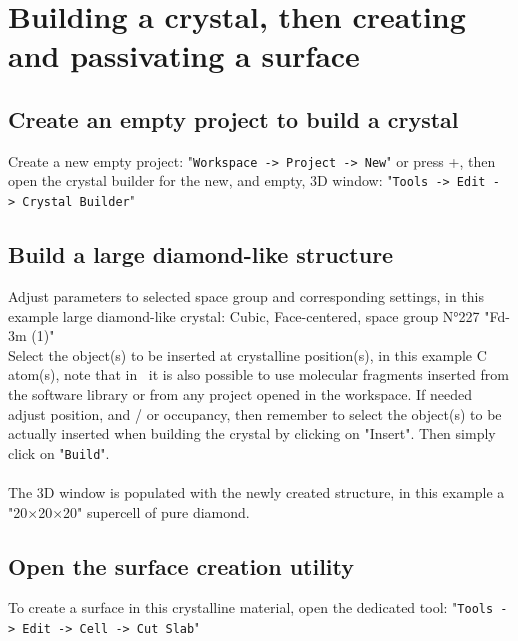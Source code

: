 \chapter{Building a crystal, then creating and passivating a surface}
\label{tuto-2}

\section{Create an empty project to build a crystal}

Create a new empty project: "\texttt{Workspace~->~Project~->~New}" or press \Ctrl+, then open the crystal builder for the new, and empty, 3D window: "\texttt{Tools~->~Edit~->~Crystal~Builder}" \\[0.5cm]

\clearpage

\section{Build a large diamond-like structure}

Adjust parameters to selected space group and corresponding settings, in this example large diamond-like crystal: Cubic, Face-centered, space group N°227 "Fd-3m (1)" \\ 
Select the object(s) to be inserted at crystalline position(s), in this example C atom(s), note that in \atomes\ it is also possible to use molecular fragments inserted from the software library or from any project opened in the workspace. 
If needed adjust position, and / or occupancy, then remember to select the object(s) to be actually inserted when building the crystal by clicking on "Insert". 
Then simply click on "\texttt{Build}". \\[0.5cm]
\\[0.5cm]
The 3D window is populated with the newly created structure, in this example a "20$\times$20$\times$20" supercell of pure diamond. 

\clearpage

\section{Open the surface creation utility}

To create a surface in this crystalline material, open the dedicated tool: "\texttt{Tools~->~Edit~->~Cell~->~Cut~Slab}" \\[0.5cm]

